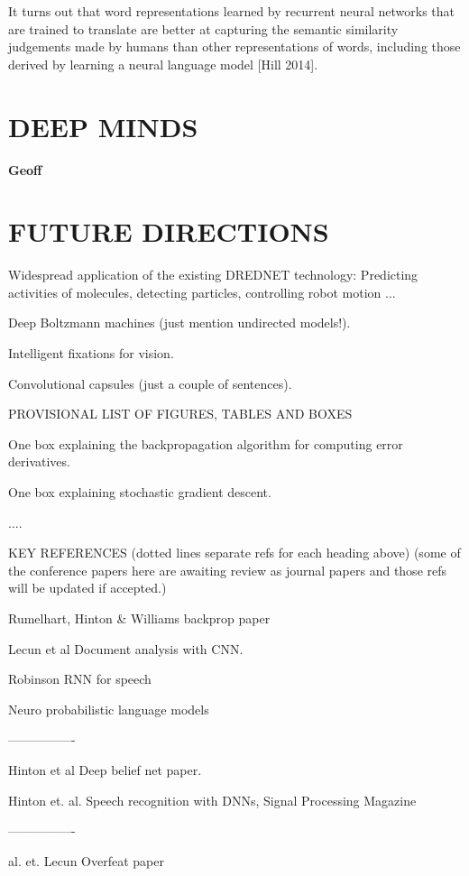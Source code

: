 \documentclass{article} %
\begin{document}
It turns out that word representations learned by recurrent neural networks
that are trained to translate are better at capturing the semantic
similarity judgements made by humans than other representations of words,
including those derived by learning a neural language model [Hill 2014].


\section{DEEP MINDS}


{\bf Geoff}

\section{FUTURE DIRECTIONS}


Widespread application of the existing DREDNET technology:  Predicting activities of molecules, detecting particles, controlling robot motion ...


Deep Boltzmann machines (just mention undirected models!).


Intelligent fixations for vision. 


Convolutional capsules (just a couple of sentences).


PROVISIONAL LIST OF FIGURES, TABLES AND BOXES


One box explaining the backpropagation algorithm for computing error derivatives.


One box explaining stochastic gradient descent.


....




KEY REFERENCES (dotted lines separate refs for each heading above)
(some of the conference papers here are awaiting review as journal papers and those refs will be updated if accepted.)


Rumelhart, Hinton \& Williams backprop paper 


Lecun et al Document analysis with CNN.


Robinson RNN for speech


Neuro probabilistic language models


----------------


Hinton et al  Deep belief net paper.


Hinton et. al. Speech recognition with DNNs, Signal Processing Magazine 


----------------


al. et. Lecun  Overfeat paper
\end{document}

